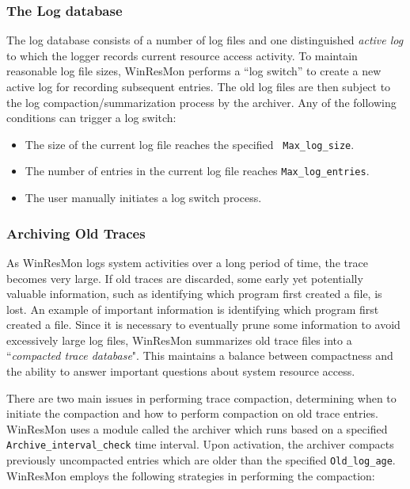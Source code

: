 \subsubsection{The Log database}

The log database consists of a number of log files and one
distinguished {\it active log} to which the logger 
records current resource access activity.
To maintain reasonable log file sizes, WinResMon performs a ``log switch'' 
to create a new active log for recording subsequent entries.  The old
log files are then subject to the log compaction/summarization process by the
archiver.  Any of the following conditions can trigger a log switch: \\

\begin{itemize}
\item The size of the current log file reaches the specified {\tt
Max\_log\_size}.
\item The number of entries in the current log file reaches
{\tt Max\_log\_entries}.
\item The user manually initiates a log switch process.
\end{itemize}


\subsubsection{Archiving Old Traces}

As WinResMon logs system activities over a long period of time, the trace
becomes very large. If old traces are discarded, some early yet potentially valuable information,
such as identifying which program first created a file, is lost. An example of important information is
identifying which program first created a file.  Since it is necessary
to eventually prune some information to avoid excessively large log files,
WinResMon summarizes old trace files into a ``{\em compacted trace database}".
This maintains a balance between compactness and the ability to answer
important questions about system resource access.

There are two main issues in performing trace compaction, determining when to
initiate the compaction and how to perform compaction on old trace entries.
WinResMon uses a module called the archiver which runs based on a specified 
{\tt Archive\_interval\_check} time interval.  Upon activation, the archiver
compacts previously uncompacted entries which are older than the specified 
{\tt Old\_log\_age}.  
WinResMon employs the following strategies in performing the compaction:

